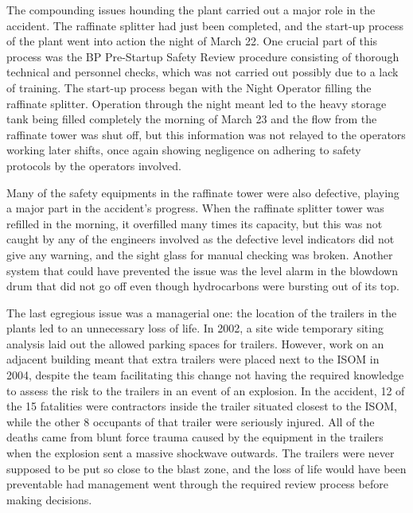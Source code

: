 \documentclass[12pt]{article}
\begin{document}
	The compounding issues hounding the plant carried out a major role in the accident. The raffinate splitter had just been completed, and the start-up process of the plant went into action the night of March 22. One crucial part of this process was the BP Pre-Startup Safety Review procedure consisting of thorough technical and personnel checks, which was not carried out possibly due to a lack of training. The start-up process began with the Night Operator filling the raffinate splitter. Operation through the night meant led to the heavy storage tank being filled completely the morning of March 23 and the flow from the raffinate tower was shut off, but this information was not relayed to the operators working later shifts, once again showing negligence on adhering to safety protocols by the operators involved. 
	
	Many of the safety equipments in the raffinate tower were also defective, playing a major part in the accident's progress. When the raffinate splitter tower was refilled in the morning, it overfilled many times its capacity, but this was not caught by any of the engineers involved as the defective level indicators did not give any warning, and the sight glass for manual checking was broken.  Another system that could have prevented the issue was the level alarm in the blowdown drum that did not go off even though hydrocarbons were bursting out of its top. 
	
	The last egregious issue was a managerial one: the location of the trailers in the plants led to an unnecessary loss of life. In 2002, a site wide temporary siting analysis laid out the allowed parking spaces for trailers. However, work on an adjacent building meant that extra trailers were placed next to the ISOM in 2004, despite the team facilitating this change not having the required knowledge to assess the risk to the trailers in an event of an explosion. In the accident, 12 of the 15 fatalities were contractors inside the trailer situated closest to the ISOM, while the other 8 occupants of that trailer were seriously injured. All of the deaths came from blunt force trauma caused by the equipment in the trailers when the explosion sent a massive shockwave outwards. The trailers were never supposed to be put so close to the blast zone, and the loss of life would have been preventable had management went through the required review process before making decisions.
	
\end{document}
